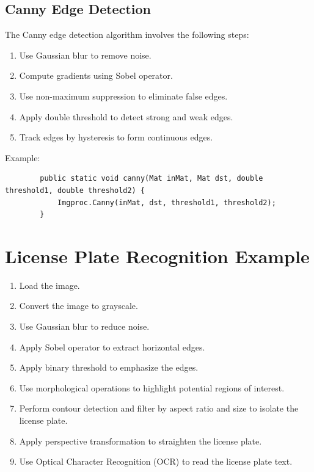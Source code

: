 \documentclass{article}
\begin{document}
		\subsection{Canny Edge Detection}
		The Canny edge detection algorithm involves the following steps:
		\begin{enumerate}
		\item Use Gaussian blur to remove noise.
		\item Compute gradients using Sobel operator.
		\item Use non-maximum suppression to eliminate false edges.
		\item Apply double threshold to detect strong and weak edges.
		\item Track edges by hysteresis to form continuous edges.
		\end{enumerate}
		
		Example:
		\begin{verbatim}
		public static void canny(Mat inMat, Mat dst, double threshold1, double threshold2) {
			Imgproc.Canny(inMat, dst, threshold1, threshold2);
		}
		\end{verbatim}
		
		\section{License Plate Recognition Example}
		\begin{enumerate}
		\item Load the image.
		\item Convert the image to grayscale.
		\item Use Gaussian blur to reduce noise.
		\item Apply Sobel operator to extract horizontal edges.
		\item Apply binary threshold to emphasize the edges.
		\item Use morphological operations to highlight potential regions of interest.
		\item Perform contour detection and filter by aspect ratio and size to isolate the license plate.
		\item Apply perspective transformation to straighten the license plate.
		\item Use Optical Character Recognition (OCR) to read the license plate text.
		\end{enumerate}
		
\end{document}
